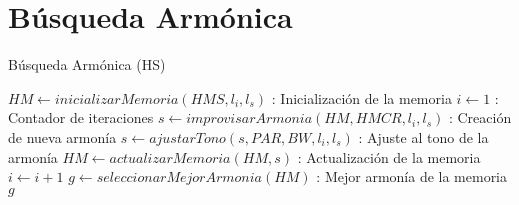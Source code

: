\documentclass[10pt,letterpaper,twoside,openright]{article}
\begin{document}
		 \newpage
		 
	\section{Búsqueda Armónica}
	
		\begin{algorithm}[H]
			\caption{Búsqueda Armónica (HS)}
				$ HM \leftarrow inicializarMemoria(HMS,l_{i},l_{s})$ : Inicialización de la memoria\;
				$ i \leftarrow 1 $ : Contador de iteraciones\;
				{
					$s \leftarrow improvisarArmonia(HM, HMCR,l_{i},l_{s})$ : Creación de nueva armonía\;
					$s \leftarrow ajustarTono(s, PAR, BW,l_{i},l_{s})$ : Ajuste al tono de la armonía\;
					$HM \leftarrow actualizarMemoria(HM,s) $ : Actualización de la memoria\;
					$ i \leftarrow  i + 1 $\;
				}
				$ g \leftarrow seleccionarMejorArmonia(HM) $ : Mejor armonía de la memoria\;
		 		\Return $ g $
		 \end{algorithm}
\end{document}
